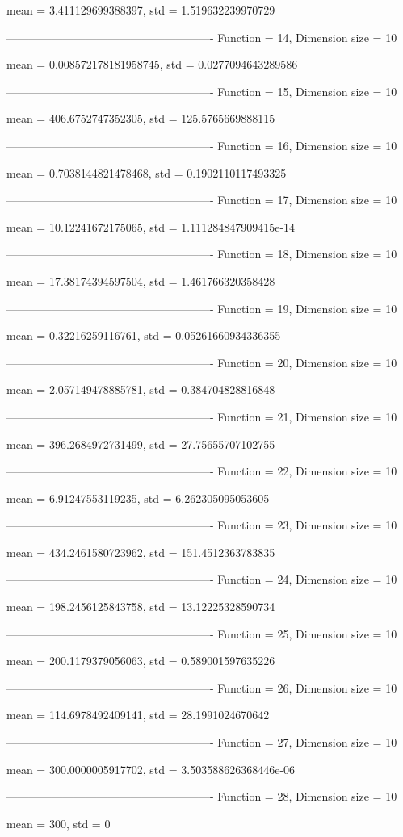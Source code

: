 mean = 3.411129699388397, std = 1.519632239970729

-------------------------------------------------------
Function = 14, Dimension size = 10


mean = 0.008572178181958745, std = 0.0277094643289586

-------------------------------------------------------
Function = 15, Dimension size = 10


mean = 406.6752747352305, std = 125.5765669888115

-------------------------------------------------------
Function = 16, Dimension size = 10


mean = 0.7038144821478468, std = 0.1902110117493325

-------------------------------------------------------
Function = 17, Dimension size = 10


mean = 10.12241672175065, std = 1.111284847909415e-14

-------------------------------------------------------
Function = 18, Dimension size = 10


mean = 17.38174394597504, std = 1.461766320358428

-------------------------------------------------------
Function = 19, Dimension size = 10


mean = 0.32216259116761, std = 0.05261660934336355

-------------------------------------------------------
Function = 20, Dimension size = 10


mean = 2.057149478885781, std = 0.384704828816848

-------------------------------------------------------
Function = 21, Dimension size = 10


mean = 396.2684972731499, std = 27.75655707102755

-------------------------------------------------------
Function = 22, Dimension size = 10


mean = 6.91247553119235, std = 6.262305095053605

-------------------------------------------------------
Function = 23, Dimension size = 10


mean = 434.2461580723962, std = 151.4512363783835

-------------------------------------------------------
Function = 24, Dimension size = 10


mean = 198.2456125843758, std = 13.12225328590734

-------------------------------------------------------
Function = 25, Dimension size = 10


mean = 200.1179379056063, std = 0.589001597635226

-------------------------------------------------------
Function = 26, Dimension size = 10


mean = 114.6978492409141, std = 28.1991024670642

-------------------------------------------------------
Function = 27, Dimension size = 10


mean = 300.0000005917702, std = 3.503588626368446e-06

-------------------------------------------------------
Function = 28, Dimension size = 10


mean = 300, std = 0
